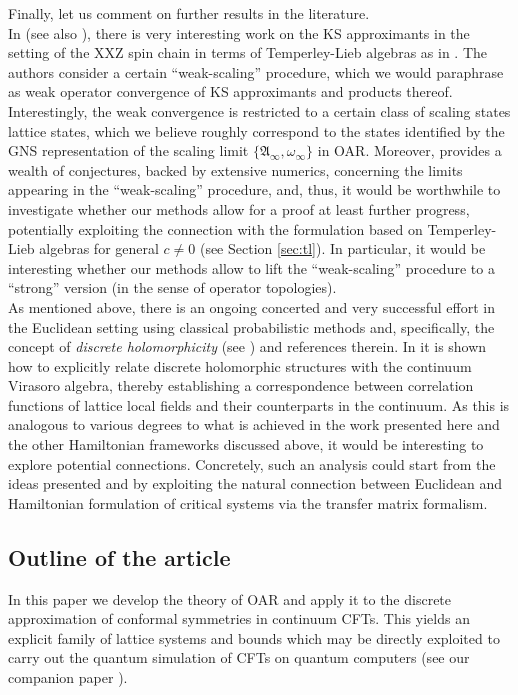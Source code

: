 \documentclass[a4paper, 11pt]{article}
\newcommand{\fA}{\mathfrak{A}}\newcommand{\cA}{\mathcal{A}}\newcommand{\dA}{\mathds{A}}\newcommand{\sA}{\mathscr{A}}
\DeclareMathOperator{\1}{\mathds{1}}
\begin{document}
Finally, let us comment on further results in the literature.\\

In \cite{GransSamuelssonTheActionOf1} (see also \cite{GransSamuelssonTheActionOf2}), there is very interesting work on the KS approximants in the setting of the XXZ spin chain in terms of Temperley-Lieb algebras as in \cite{KooRepresentationsOfThe}. The authors consider a certain ``weak-scaling'' procedure, which we would paraphrase as weak operator convergence of KS approximants and products thereof. Interestingly, the weak convergence is restricted to a certain class of scaling states lattice states, which we believe roughly correspond to the states identified by the GNS representation of the scaling limit $\{\fA_{\infty},\omega_{\infty}\}$ in OAR. Moreover, \cite{GransSamuelssonTheActionOf1} provides a wealth of conjectures, backed by extensive numerics, concerning the limits appearing in the ``weak-scaling'' procedure, and, thus, it would be worthwhile to investigate whether our methods allow for a proof at least further progress, potentially exploiting the connection with the formulation based on Temperley-Lieb algebras for general $c\neq0$ (see Section \ref{sec:tl}). In particular, it would be interesting whether our methods allow to lift the ``weak-scaling'' procedure to a ``strong'' version (in the sense of operator topologies).\\

As mentioned above, there is an ongoing concerted and very successful effort in the Euclidean setting using classical probabilistic methods and, specifically, the concept of \textit{discrete holomorphicity} (see \cite{HonglerConformalFieldTheory, ChelkakCorrelationsOfPrimary, ChelkakConformalInvarianceOf}) and references therein. In \cite{HonglerConformalFieldTheory} it is shown how to explicitly relate discrete holomorphic structures with the continuum Virasoro algebra, thereby establishing a correspondence between correlation functions of lattice local fields and their counterparts in the continuum. As this is analogous to various degrees to what is achieved in the work presented here and the other Hamiltonian frameworks discussed above, it would be interesting to explore potential connections. Concretely, such an analysis could start from the ideas presented \cite{FendleyIntegrabilityAndBraided} and by exploiting the natural connection between Euclidean and Hamiltonian formulation of critical systems via the transfer matrix formalism.

\subsection{Outline of the article}
\label{sec:outline}
In this paper we develop the theory of OAR and apply it to the discrete approximation of conformal symmetries in continuum CFTs. This yields an explicit family of lattice systems and bounds which may be directly exploited to carry out the quantum simulation of CFTs on quantum computers (see our companion paper \cite{OsborneCFTsim}). 
\end{document}
